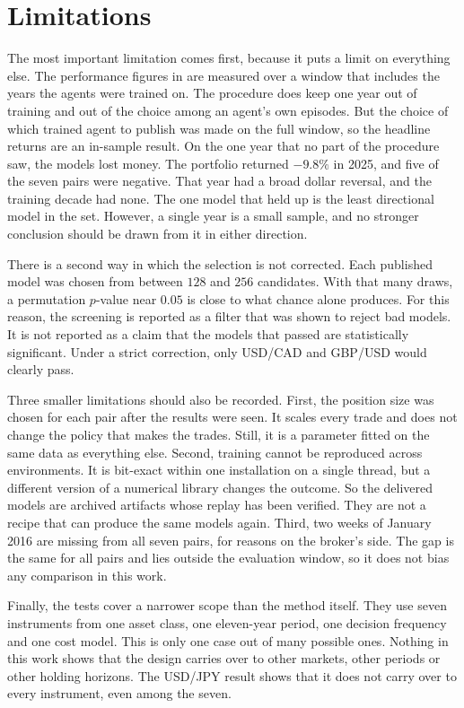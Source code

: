 \section{Limitations}
\label{Section:Limitations}

The most important limitation comes first, because it puts a limit on everything else. The performance figures in  are measured over a window that includes the years the agents were trained on. The procedure does keep one year out of training and out of the choice among an agent's own episodes. But the choice of which trained agent to publish was made on the full window, so the headline returns are an in-sample result. On the one year that no part of the procedure saw, the models lost money. The portfolio returned $-9.8\%$ in 2025, and five of the seven pairs were negative. That year had a broad dollar reversal, and the training decade had none. The one model that held up is the least directional model in the set. However, a single year is a small sample, and no stronger conclusion should be drawn from it in either direction.

There is a second way in which the selection is not corrected. Each published model was chosen from between $128$ and $256$ candidates. With that many draws, a permutation $p$-value near $0.05$ is close to what chance alone produces. For this reason, the screening is reported as a filter that was shown to reject bad models. It is not reported as a claim that the models that passed are statistically significant. Under a strict correction, only USD/CAD and GBP/USD would clearly pass.

Three smaller limitations should also be recorded. First, the position size was chosen for each pair after the results were seen. It scales every trade and does not change the policy that makes the trades. Still, it is a parameter fitted on the same data as everything else. Second, training cannot be reproduced across environments. It is bit-exact within one installation on a single thread, but a different version of a numerical library changes the outcome. So the delivered models are archived artifacts whose replay has been verified. They are not a recipe that can produce the same models again. Third, two weeks of January 2016 are missing from all seven pairs, for reasons on the broker's side. The gap is the same for all pairs and lies outside the evaluation window, so it does not bias any comparison in this work.

Finally, the tests cover a narrower scope than the method itself. They use seven instruments from one asset class, one eleven-year period, one decision frequency and one cost model. This is only one case out of many possible ones. Nothing in this work shows that the design carries over to other markets, other periods or other holding horizons. The USD/JPY result shows that it does not carry over to every instrument, even among the seven.